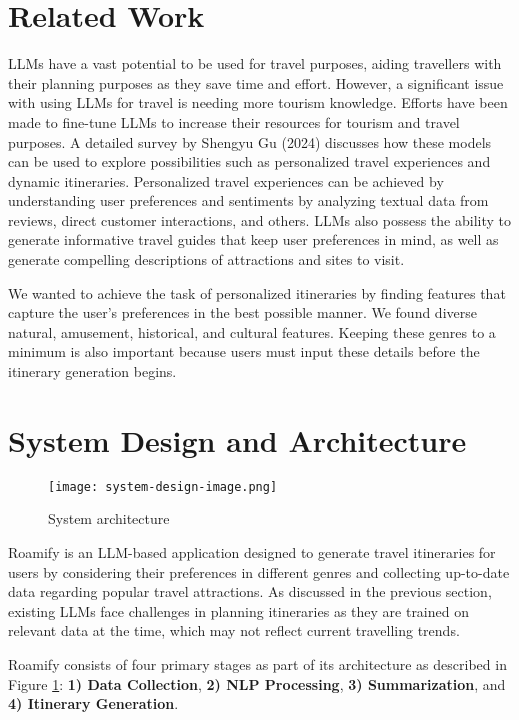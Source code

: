 \documentclass[final,1p,times]{elsarticle}
\begin{document}
\section{Related Work}
    LLMs have a vast potential to be used for travel purposes, aiding travellers with their planning purposes as they save time and effort. However, a significant issue with using LLMs for travel is needing more tourism knowledge\cite{ref1}. Efforts have been made to fine-tune LLMs to increase their resources for tourism and travel purposes\cite{ref3}. A detailed survey by Shengyu Gu (2024) discusses how these models can be used to explore possibilities such as personalized travel experiences and dynamic itineraries\cite{ref4}. Personalized travel experiences can be achieved by understanding user preferences and sentiments by analyzing textual data from reviews, direct customer interactions, and others. LLMs also possess the ability to generate informative travel guides that keep user preferences in mind, as well as generate compelling descriptions of attractions and sites to visit.
    
    We wanted to achieve the task of personalized itineraries by finding features that capture the user's preferences in the best possible manner. We found diverse natural, amusement, historical, and cultural features. Keeping these genres to a minimum is also important because users must input these details before the itinerary generation begins.

\section{System Design and Architecture}
    
    \begin{figure}[h!]
        \centering
        \texttt{[image: system-design-image.png]}
        \caption{System architecture}
        \label{fig:system-design}
    \end{figure}
    
    Roamify is an LLM-based application designed to generate travel itineraries for users by considering their preferences in different genres and collecting up-to-date data regarding popular travel attractions. As discussed in the previous section, existing LLMs face challenges in planning itineraries as they are trained on relevant data at the time, which may not reflect current travelling trends.
    
    Roamify consists of four primary stages as part of its architecture as described in Figure \ref{fig:system-design}: \textbf{1) Data Collection}, \textbf{2) NLP Processing}, \textbf{3) Summarization}, and \textbf{4) Itinerary Generation}.
    
\end{document}
